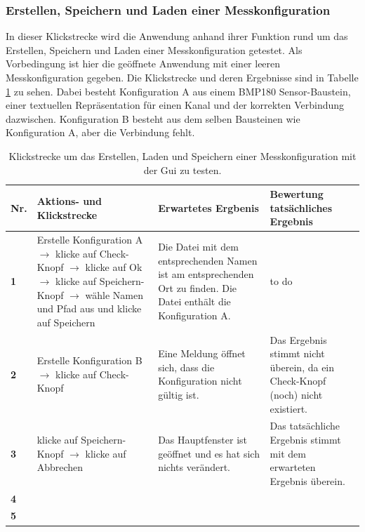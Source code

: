 \documentclass[parskip=full]{scrartcl}
\begin{document}
\subsubsection{Erstellen, Speichern und Laden einer Messkonfiguration}

In dieser Klickstrecke wird die Anwendung anhand ihrer Funktion rund um das Erstellen, Speichern und Laden einer Messkonfiguration getestet. Als Vorbedingung ist hier die geöffnete Anwendung mit einer leeren Messkonfiguration gegeben. Die Klickstrecke und deren Ergebnisse sind in Tabelle \ref{klickConfig} zu sehen. Dabei besteht Konfiguration A aus einem BMP180 Sensor-Baustein, einer textuellen Repräsentation für einen Kanal und der korrekten Verbindung dazwischen. Konfiguration B besteht aus dem selben Bausteinen wie Konfiguration A, aber die Verbindung fehlt.  

\begin{table}[h]
\begin{tabular}{| p{} | p{} | p{} | p{} |}
	\hline
	\textbf{Nr.} & \textbf{Aktions- und Klickstrecke} & \textbf{Erwartetes Ergbenis}  & \textbf{ Bewertung tatsächliches Ergebnis} \\ \hline
	\textbf{1}
	& 
	Erstelle Konfiguration A $\rightarrow$ klicke auf Check-Knopf $\rightarrow$ klicke auf Ok $\rightarrow$ klicke auf Speichern-Knopf $\rightarrow$ wähle Namen und Pfad aus und klicke auf Speichern 
	&
	Die Datei mit dem entsprechenden Namen ist am entsprechenden Ort zu finden. Die Datei enthält die Konfiguration A.
	& 
	to do
	\\ \hline
	
	\textbf{2}
	& 
	Erstelle Konfiguration B $\rightarrow$ klicke auf Check-Knopf
	&
	Eine Meldung öffnet sich, dass die Konfiguration nicht gültig ist.
	& 
	Das Ergebnis stimmt nicht überein, da ein Check-Knopf (noch) nicht existiert.
	\\ \hline
	
	\textbf{3}
	& 
	klicke auf Speichern-Knopf $\rightarrow$ klicke auf Abbrechen
	&
	Das Hauptfenster ist geöffnet und es hat sich nichts verändert.
	& 
	Das tatsächliche Ergebnis stimmt mit dem erwarteten Ergebnis überein.
	\\ \hline
	
	\textbf{4}
	& 
	
	&
	
	& 
	
	\\ \hline
	
	\textbf{5}
	& 
	
	&
	
	& 
	
	\\ \hline
	
		
	
	
\end{tabular}
\caption{Klickstrecke um das Erstellen, Laden und Speichern einer Messkonfiguration mit der Gui zu testen.}
\label{klickConfig}
\end{table}
\end{document}
